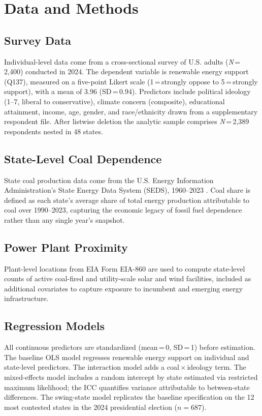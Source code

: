 \documentclass[9pt,twoside]{pnas-new}
\begin{document}
\section*{Data and Methods}
\subsection*{Survey Data}
Individual-level data come from a cross-sectional survey of U.S. adults
(\textit{N}\,=\,2,400) conducted in 2024. The dependent variable is renewable
energy support (Q137), measured on a five-point Likert scale
(1\,=\,strongly oppose to 5\,=\,strongly support), with a mean of 3.96
(SD\,=\,0.94). Predictors include political ideology (1--7, liberal to
conservative), climate concern (composite), educational attainment, income,
age, gender, and race/ethnicity drawn from a supplementary respondent file.
After listwise deletion the analytic sample comprises
\textit{N}\,=\,2,389 respondents nested in 48 states.

\subsection*{State-Level Coal Dependence}
State coal production data come from the U.S. Energy Information Administration's
State Energy Data System (SEDS), 1960--2023 \cite{EIA2023}. Coal share is defined
as each state's average share of total energy production attributable to coal over
1990--2023, capturing the economic legacy of fossil fuel dependence rather than
any single year's snapshot.

\subsection*{Power Plant Proximity}
Plant-level locations from EIA Form EIA-860 are used to compute state-level
counts of active coal-fired and utility-scale solar and wind facilities,
included as additional covariates to capture exposure to incumbent and emerging
energy infrastructure.

\subsection*{Regression Models}
All continuous predictors are standardized (mean\,=\,0, SD\,=\,1) before
estimation. The baseline OLS model regresses renewable energy support on
individual and state-level predictors. The interaction model adds a
coal\,$\times$\,ideology term. The mixed-effects model includes a random
intercept by state estimated via restricted maximum likelihood; the ICC
quantifies variance attributable to between-state differences. The swing-state
model replicates the baseline specification on the 12 most contested states
in the 2024 presidential election ($n = 687$).
\end{document}
